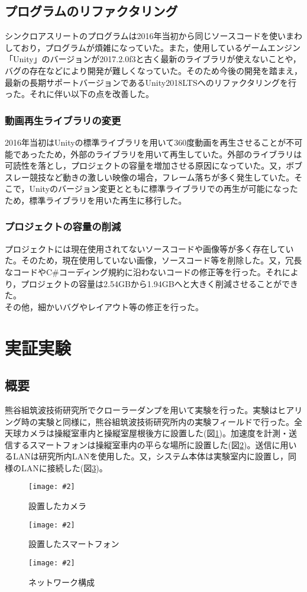 \documentclass[a4paper,12pt]{jsarticle}
\newcommand{\figuref}[1]{図\ref{#1}}
\newcommand{\fig}[4][width=\textwidth]{
    \begin{figure}[!h]
    \begin{center}
    \texttt{[image: \#2]}
    \caption{#3}
    \label{#4}
    \vspace*{-1cm}
    \end{center}
    \end{figure}
}
\begin{document}
\subsection{プログラムのリファクタリング}
シンクロアスリートのプログラムは2016年当初から同じソースコードを使いまわしており，プログラムが煩雑になっていた。また，使用しているゲームエンジン「Unity」のバージョンが2017.2.0f3と古く最新のライブラリが使えないことや，バグの存在などにより開発が難しくなっていた。そのため今後の開発を踏まえ，最新の長期サポートバージョンであるUnity2018LTSへのリファクタリングを行った。それに伴い以下の点を改善した。

\subsubsection{動画再生ライブラリの変更}
2016年当初はUnityの標準ライブラリを用いて360度動画を再生させることが不可能であったため，外部のライブラリを用いて再生していた。外部のライブラリは可読性を落とし，プロジェクトの容量を増加させる原因になっていた。又，ボブスレー競技など動きの激しい映像の場合，フレーム落ちが多く発生していた。そこで，Unityのバージョン変更とともに標準ライブラリでの再生が可能になったため，標準ライブラリを用いた再生に移行した。

\subsubsection{プロジェクトの容量の削減}
プロジェクトには現在使用されてないソースコードや画像等が多く存在していた。そのため，現在使用していない画像，ソースコード等を削除した。又，冗長なコードやC\#コーディング規約に沿わないコードの修正等を行った。それにより，プロジェクトの容量は2.54GBから1.94GBへと大きく削減させることができた。
\\

その他，細かいバグやレイアウト等の修正を行った。

\clearpage

\section{実証実験}
\subsection{概要}
熊谷組筑波技術研究所でクローラーダンプを用いて実験を行った。実験はヒアリング時の実験と同様に，熊谷組筑波技術研究所内の実験フィールドで行った。全天球カメラは操縦室車内と操縦室屋根後方に設置した(\figuref{camera_test})。加速度を計測・送信するスマートフォンは操縦室車内の平らな場所に設置した(\figuref{phone})。送信に用いるLANは研究所内LANを使用した。又，システム本体は実験室内に設置し，同様のLANに接続した(\figuref{lan})。
\fig[width=7cm]{image/camera_test.png}{設置したカメラ}{camera_test}
\fig[width=7cm]{image/phone.jpg}{設置したスマートフォン}{phone}
\clearpage
\fig[width=7cm]{image/lan.png}{ネットワーク構成}{lan}
\end{document}
